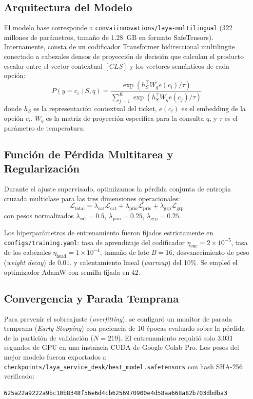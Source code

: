\documentclass[10pt,journal,compsoc]{IEEEtran}
\begin{document}
\subsection{Arquitectura del Modelo}
El modelo base corresponde a \texttt{convaiinnovations/laya-multilingual} (322 millones de par\'ametros, tama\~no de 1.28~GB en formato SafeTensors). Internamente, consta de un codificador Transformer bidireccional multiling\"ue conectado a cabezales densos de proyecci\'on de decisi\'on que calculan el producto escalar entre el vector contextual $[CLS]$ y los vectores sem\'anticos de cada opci\'on:
\begin{equation}
P(y = c_i \mid S, q) = \frac{\exp(h_S^\top W_q e(c_i) / \tau)}{\sum_{j=1}^{K} \exp(h_S^\top W_q e(c_j) / \tau)}
\end{equation}
donde $h_S$ es la representaci\'on contextual del ticket, $e(c_i)$ es el embedding de la opci\'on $c_i$, $W_q$ es la matriz de proyecci\'on espec\'{\i}fica para la consulta $q$, y $\tau$ es el par\'ametro de temperatura.

\subsection{Funci\'on de P\'erdida Multitarea y Regularizaci\'on}
Durante el ajuste supervisado, optimizamos la p\'erdida conjunta de entrop\'{\i}a cruzada multiclase para las tres dimensiones operacionales:
\begin{equation}
\mathcal{L}_{\text{total}} = \lambda_{\text{cat}} \mathcal{L}_{\text{cat}} + \lambda_{\text{prio}} \mathcal{L}_{\text{prio}} + \lambda_{\text{grp}} \mathcal{L}_{\text{grp}}
\end{equation}
con pesos normalizados $\lambda_{\text{cat}} = 0.5$, $\lambda_{\text{prio}} = 0.25$, $\lambda_{\text{grp}} = 0.25$.

Los hiperpar\'ametros de entrenamiento fueron fijados estrictamente en \texttt{configs/training.yaml}:
tasa de aprendizaje del codificador $\eta_{\text{enc}} = 2 \times 10^{-5}$, tasa de los cabezales $\eta_{\text{head}} = 1 \times 10^{-4}$, tama\~no de lote $B = 16$, desvanecimiento de peso (\emph{weight decay}) de $0.01$, y calentamiento lineal (\emph{warmup}) del 10\%. Se emple\'o el optimizador AdamW con semilla fijada en $42$.

\subsection{Convergencia y Parada Temprana}
Para prevenir el sobreajuste (\emph{overfitting}), se configur\'o un monitor de parada temprana (\emph{Early Stopping}) con paciencia de 10 \'epocas evaluado sobre la p\'erdida de la partici\'on de validaci\'on ($N=219$). El entrenamiento requiri\'o solo 3.031 segundos de GPU en una instancia CUDA de Google Colab Pro. Los pesos del mejor modelo fueron exportados a \texttt{checkpoints/laya\_service\_desk/best\_model.safetensors} con hash SHA-256 verificado:
\begin{center}
\texttt{625a22a9222a9bc10b8348f56e6d4cb6256970900e4d58aa668a82b703dbdba3}
\end{center}
\end{document}
